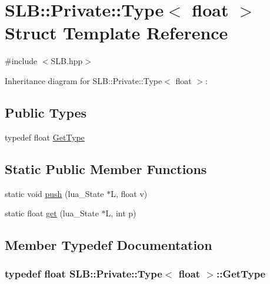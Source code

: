 \hypertarget{structSLB_1_1Private_1_1Type_3_01float_01_4}{}\section{S\+LB\+:\+:Private\+:\+:Type$<$ float $>$ Struct Template Reference}
\label{structSLB_1_1Private_1_1Type_3_01float_01_4}


{\ttfamily \#include $<$S\+L\+B.\+hpp$>$}



Inheritance diagram for S\+LB\+:\+:Private\+:\+:Type$<$ float $>$\+:
\subsection*{Public Types}
\begin{DoxyCompactItemize}
\item 
typedef float \hyperlink{structSLB_1_1Private_1_1Type_3_01float_01_4_a6deb2b800d2b7d5952845c3a6a3a3629}{Get\+Type}
\end{DoxyCompactItemize}
\subsection*{Static Public Member Functions}
\begin{DoxyCompactItemize}
\item 
static void \hyperlink{structSLB_1_1Private_1_1Type_3_01float_01_4_a68768ab23ba6e9c302e3b3e2413f07b9}{push} (lua\+\_\+\+State $\ast$L, float v)
\item 
static float \hyperlink{structSLB_1_1Private_1_1Type_3_01float_01_4_ab15d1be8fa33acf555bd9cad597ad45e}{get} (lua\+\_\+\+State $\ast$L, int p)
\end{DoxyCompactItemize}


\subsection{Member Typedef Documentation}
\subsubsection[{\texorpdfstring{Get\+Type}{GetType}}]{\setlength{\rightskip}{0pt plus 5cm}typedef float {\bf S\+L\+B\+::\+Private\+::\+Type}$<$ float $>$\+::{\bf Get\+Type}}\hypertarget{structSLB_1_1Private_1_1Type_3_01float_01_4_a6deb2b800d2b7d5952845c3a6a3a3629}{}\label{structSLB_1_1Private_1_1Type_3_01float_01_4_a6deb2b800d2b7d5952845c3a6a3a3629}


